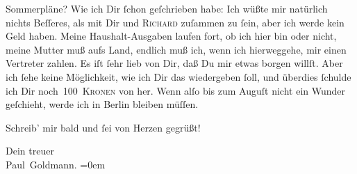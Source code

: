 \pstart
           Sommerpläne? Wie ich Dir ſchon geſchrieben habe: Ich wüßte mir natürlich nichts
               Beſſeres, als mit Dir und \textsc{Richard} zuſammen zu ſein, aber ich werde kein Geld haben. Meine Haushalt-Ausgaben
               laufen fort, ob ich hier bin oder nicht, meine Mutter muß aufs Land, endlich muß ich, wenn ich hierweggehe, mir einen Vertreter zahlen. Es iſt ſehr
               lieb von Dir, daß Du mir etwas borgen willſt. Aber ich ſehe keine Möglichkeit, wie
               ich Dir das wiedergeben ſoll, und überdies ſchulde ich Dir noch 100 \textsc{Kronen} von \label{K_L02917-5v}\label{K_L02917-5} her. Wenn alſo bis zum Auguſt nicht ein Wunder
               geſchieht, werde ich in Berlin bleiben
               müſſen.\pend
           
\pstart
           Schreib’ mir bald und ſei von Herzen gegrüßt!\pend
           
\pstart
           Dein treuer {\\[\baselineskip]}\spacefill\mbox{Paul Goldmann.}\pend
           \leftskip=0em{}\endnumbering{}  
      